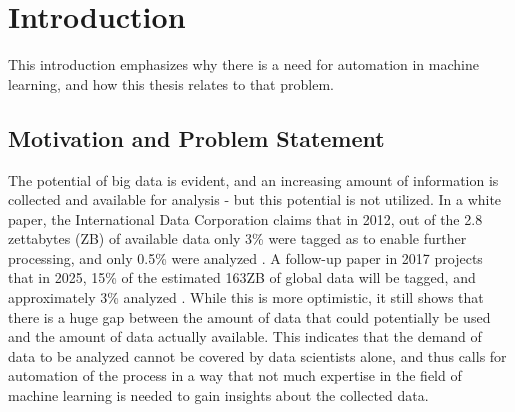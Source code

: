 %
\chapter{Introduction}
\label{sec:intro}

This introduction emphasizes why there is a need for automation in machine learning, and how this thesis relates to that problem. 

\section{Motivation and Problem Statement}
\label{sec:intro:motivation}
The potential of big data is evident, and an increasing amount of information is collected and available for analysis - but this potential is not utilized. In a white paper, the International Data Corporation claims that in 2012, out of the 2.8 zettabytes (ZB) of available data only 3\% were tagged as to enable further processing, and only 0.5\% were analyzed \cite{gantz2012the}. A follow-up paper in 2017 projects that in 2025, 15\% of the estimated 163ZB of global data will be tagged, and approximately 3\% analyzed \cite{gantz2017data}. While this is more optimistic, it still shows that there is a huge gap between the amount of data that could potentially be used and the amount of data actually available. This indicates that the demand of data to be analyzed cannot be covered by data scientists alone, and thus calls for automation of the process in a way that not much expertise in the field of machine learning is needed to gain insights about the collected data.

